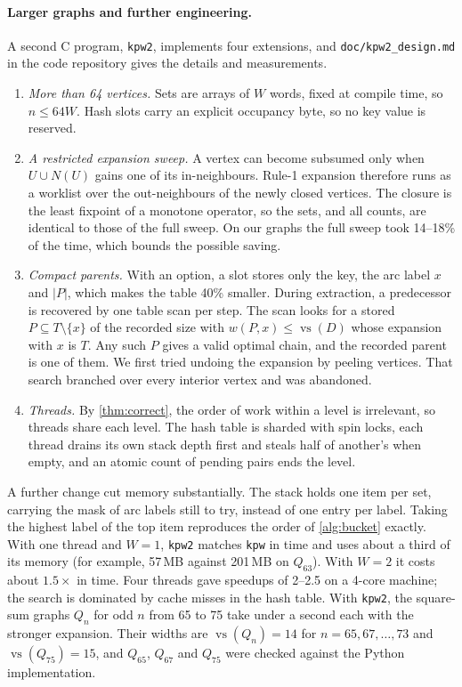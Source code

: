 \documentclass[11pt]{article}
\theoremstyle{definition}
\newcommand{\vs}{\operatorname{vs}}
\newcommand{\cost}{w}
\newcommand{\set}[1]{\{#1\}}
\begin{document}
\paragraph{Larger graphs and further engineering.}
A second C program, \texttt{kpw2}, implements four extensions, and
\texttt{doc/kpw2\_design.md} in the code repository gives the details and
measurements.
\begin{enumerate}
\item \emph{More than 64 vertices.} Sets are arrays of $W$ words, fixed at
compile time, so $n\le64W$. Hash slots carry an explicit occupancy byte, so
no key value is reserved.
\item \emph{A restricted expansion sweep.} A vertex can become subsumed
only when $U\cup N(U)$ gains one of its in-neighbours. Rule-1 expansion
therefore runs as a worklist over the out-neighbours of the newly closed
vertices. The closure is the least fixpoint of a monotone operator, so the
sets, and all counts, are identical to those of the full sweep. On our
graphs the full sweep took 14--18\% of the time, which bounds the possible
saving.
\item \emph{Compact parents.} With an option, a slot stores only the key,
the arc label $x$ and $|P|$, which makes the table 40\% smaller. During
extraction, a predecessor is recovered by one table scan per step. The scan
looks for a stored $P\subseteq T\setminus\set x$ of the recorded size with
$\cost(P,x)\le\vs(D)$ whose expansion with $x$ is $T$. Any such $P$ gives a
valid optimal chain, and the recorded parent is one of them. We first tried
undoing the expansion by peeling vertices. That search branched over every
interior vertex and was abandoned.
\item \emph{Threads.} By \cref{thm:correct}, the order of work within a
level is irrelevant, so threads share each level. The hash table is
sharded with spin locks, each thread drains its own stack depth first and
steals half of another's when empty, and an atomic count of pending pairs
ends the level.
\end{enumerate}
A further change cut memory substantially. The stack holds one item per
set, carrying the mask of arc labels still to try, instead of one entry per
label. Taking the highest label of the top item reproduces the order of
\cref{alg:bucket} exactly. With one thread and $W=1$, \texttt{kpw2}
matches \texttt{kpw} in time and uses about a third of its memory (for
example, 57\,MB against 201\,MB on $Q_{63}$). With $W=2$ it costs about
$1.5\times$ in time. Four threads gave speedups of 2--2.5 on a 4-core
machine; the search is dominated by cache misses in the hash table. With
\texttt{kpw2}, the square-sum graphs $Q_n$ for odd $n$ from 65 to 75 take under a
second each with the stronger expansion. Their widths are
$\vs(Q_n)=14$ for $n=65,67,\dots,73$ and $\vs(Q_{75})=15$, and
$Q_{65}$, $Q_{67}$ and $Q_{75}$ were checked against the Python
implementation.
\end{document}
